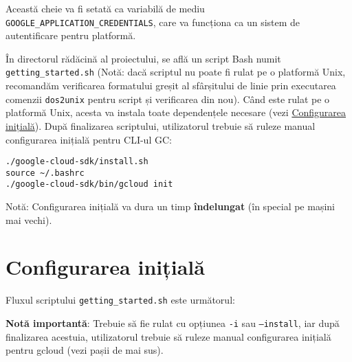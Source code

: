 Această cheie va fi setată ca variabilă de mediu \texttt{GOOGLE\_APPLICATION\_CREDENTIALS}, care va funcționa ca un sistem de autentificare pentru platformă.

În directorul rădăcină al proiectului, se află un script Bash numit \texttt{getting\_started.sh} (Notă: dacă scriptul nu poate fi rulat pe o platformă Unix, recomandăm verificarea formatului greșit al sfârșitului de linie prin executarea comenzii \texttt{dos2unix} pentru script și verificarea din nou). Când este rulat pe o platformă Unix, acesta va instala toate dependențele necesare (vezi \hyperref[first-time-setup]{Configurarea inițială}). După finalizarea scriptului, utilizatorul trebuie să ruleze manual configurarea inițială pentru CLI-ul GC:

\begin{verbatim}
./google-cloud-sdk/install.sh
source ~/.bashrc
./google-cloud-sdk/bin/gcloud init
\end{verbatim}

Notă: Configurarea inițială va dura un timp \textbf{îndelungat} (în special pe mașini mai vechi).

\section{Configurarea inițială}
Fluxul scriptului \texttt{getting\_started.sh} este următorul:

\textbf{Notă importantă}: Trebuie să fie rulat cu opțiunea \texttt{-i} sau \texttt{--install}, iar după finalizarea acestuia, utilizatorul trebuie să ruleze manual configurarea inițială pentru gcloud (vezi pașii de mai sus).

